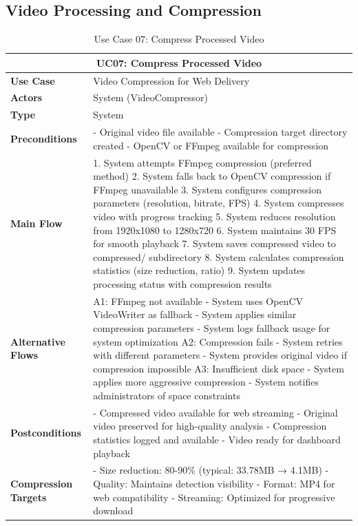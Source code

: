 \documentclass{article}
\begin{document}
\subsection{Video Processing and Compression}

\begin{table}[H]
\centering
\begin{tabularx}{\textwidth}{|l|X|}
\hline
\multicolumn{2}{|c|}{\textbf{UC07: Compress Processed Video}} \\ \hline
\textbf{Use Case} & Video Compression for Web Delivery \\ \hline
\textbf{Actors} & System (VideoCompressor) \\ \hline
\textbf{Type} & System \\ \hline
\textbf{Preconditions} & 
- Original video file available
- Compression target directory created
- OpenCV or FFmpeg available for compression \\ \hline
\textbf{Main Flow} & 
1. System attempts FFmpeg compression (preferred method)
2. System falls back to OpenCV compression if FFmpeg unavailable
3. System configures compression parameters (resolution, bitrate, FPS)
4. System compresses video with progress tracking
5. System reduces resolution from 1920x1080 to 1280x720
6. System maintains 30 FPS for smooth playback
7. System saves compressed video to compressed/ subdirectory
8. System calculates compression statistics (size reduction, ratio)
9. System updates processing status with compression results \\ \hline
\textbf{Alternative Flows} & 
A1: FFmpeg not available
- System uses OpenCV VideoWriter as fallback
- System applies similar compression parameters
- System logs fallback usage for system optimization
A2: Compression fails
- System retries with different parameters
- System provides original video if compression impossible
A3: Insufficient disk space
- System applies more aggressive compression
- System notifies administrators of space constraints \\ \hline
\textbf{Postconditions} & 
- Compressed video available for web streaming
- Original video preserved for high-quality analysis
- Compression statistics logged and available
- Video ready for dashboard playback \\ \hline
\textbf{Compression Targets} & 
- Size reduction: 80-90\% (typical: 33.78MB → 4.1MB)
- Quality: Maintains detection visibility
- Format: MP4 for web compatibility
- Streaming: Optimized for progressive download \\ \hline
\end{tabularx}
\caption{Use Case 07: Compress Processed Video}
\end{table}
\end{document}
